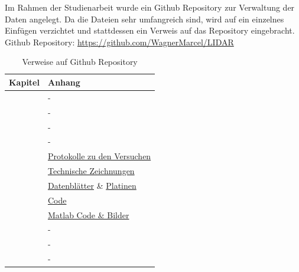 \newpage
{}
Im Rahmen der Studienarbeit wurde ein Github Repository zur Verwaltung der Daten angelegt. Da die Dateien sehr umfangreich sind, wird auf ein einzelnes Einfügen verzichtet und stattdessen ein Verweis auf das Repository eingebracht.\\
Github Repository: \href{https://github.com/WagnerMarcel/LIDAR}{https://github.com/WagnerMarcel/LIDAR}
\begin{table}[H]
	\centering
	\caption{Verweise auf Github Repository}
	\begin{tabular}{|l|l|}
		\hline
		\textbf{Kapitel} & \textbf{Anhang} \\\hline
		\fullref{chap:einleitung} & - \\\hline
		\fullref{chap:grundlagen_et} & - \\\hline
		\fullref{chap:grund_lidar} & - \\\hline
		\fullref{chap:stand_der_technik} & -\\\hline
		\fullref{chap:machbarkeitsstudie} & \href{https://github.com/WagnerMarcel/LIDAR/tree/master/04_Protokolle}{Protokolle zu den Versuchen} \\\hline
		\fullref{chap:mechanik} & \href{https://github.com/WagnerMarcel/LIDAR/tree/master/08_Mechanik}{Technische Zeichnungen} \\\hline
		\fullref{chap:hardware} & \href{https://github.com/WagnerMarcel/LIDAR/tree/master/05_Datenblätter/VL53L1X}{Datenblätter} \& \href{https://github.com/WagnerMarcel/LIDAR/tree/master/09_Platinen}{Platinen}\\\hline
		\fullref{chap:code} & \href{https://github.com/WagnerMarcel/LIDAR/tree/master/07_Code}{Code} \\\hline
		\fullref{chap:auswertung_matlab} & \href{https://github.com/WagnerMarcel/LIDAR/tree/master/11_Auswertung}{Matlab Code \& Bilder} \\\hline
		\fullref{chap:validierung} & - \\\hline
		\fullref{chap:fazit} & - \\\hline
		\fullref{chap:ausblick} & - \\\hline
	\end{tabular}
\end{table}

